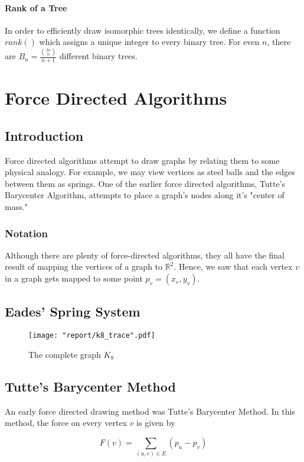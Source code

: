 \documentclass[11pt]{report}
\begin{document}
\subsubsection{Rank of a Tree}
In order to efficiently draw isomorphic trees identically, we define a function $rank()$ which assigns a unique integer to every binary tree. For even $n$, there are $B_n = \frac{ \binom{2n}{n} }{ n + 1 }$ different binary trees.

\pagebreak

\chapter{Force Directed Algorithms}
\section{Introduction}
Force directed algorithms attempt to draw graphs by relating them to some physical analogy. For example, we may view vertices as steel balls and the edges between them as springs. One of the earlier force directed algorithms, Tutte's Barycenter Algorithm, attempts to place a graph's nodes along it's "center of mass."

\subsection{Notation}
Although there are plenty of force-directed algorithms, they all have the final result of mapping the vertices of a graph to $\mathbb{R}^2$. Hence, we saw that each vertex $v$ in a graph gets mapped to some point $p_v = (x_v, y_v)$. 

\section{Eades' Spring System}

\begin{figure}[H]
    \centering
    \texttt{[image: "report/k8\_trace".pdf]}
    \caption{The complete graph $K_8$}
\end{figure}

\section{Tutte's Barycenter Method}
An early force directed drawing method was Tutte's Barycenter Method. In this method, the force on every vertex $v$ is given by 

\begin{equation}\label{eq:barycenter}
F(v) = \sum_{(u, v) \in E} (p_u - p_v)
\end{equation}
\end{document}
